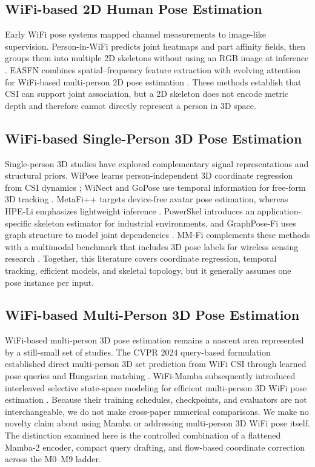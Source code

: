 \documentclass[conference,onecolumn]{IEEEtran}
\begin{document}
\subsection{WiFi-based 2D Human Pose Estimation}
Early WiFi pose systems mapped channel measurements to image-like supervision. Person-in-WiFi predicts joint heatmaps and part affinity fields, then groups them into multiple 2D skeletons without using an RGB image at inference \cite{wang2019personwifi2d}. EASFN combines spatial--frequency feature extraction with evolving attention for WiFi-based multi-person 2D pose estimation \cite{chen2023easfn}. These methods establish that CSI can support joint association, but a 2D skeleton does not encode metric depth and therefore cannot directly represent a person in 3D space.

\subsection{WiFi-based Single-Person 3D Pose Estimation}
Single-person 3D studies have explored complementary signal representations and structural priors. WiPose learns person-independent 3D coordinate regression from CSI dynamics \cite{jiang2020wipose}; WiNect and GoPose use temporal information for free-form 3D tracking \cite{ren2021winect,ren2022gopose}. MetaFi++ targets device-free avatar pose estimation, whereas HPE-Li emphasizes lightweight inference \cite{zhou2023metafiplus,gian2024hpeli}. PowerSkel introduces an application-specific skeleton estimator for industrial environments, and GraphPose-Fi uses graph structure to model joint dependencies \cite{yin2024powerskel,chen2025graphwifi}. MM-Fi complements these methods with a multimodal benchmark that includes 3D pose labels for wireless sensing research \cite{yang2023mmfi}. Together, this literature covers coordinate regression, temporal tracking, efficient models, and skeletal topology, but it generally assumes one pose instance per input.

\subsection{WiFi-based Multi-Person 3D Pose Estimation}
WiFi-based multi-person 3D pose estimation remains a nascent area represented by a still-small set of studies. The CVPR 2024 query-based formulation established direct multi-person 3D set prediction from WiFi CSI through learned pose queries and Hungarian matching \cite{yan2024personwifi3d}. WiFi-Mamba subsequently introduced interleaved selective state-space modeling for efficient multi-person 3D WiFi pose estimation \cite{nguyen2026wifimamba}. Because their training schedules, checkpoints, and evaluators are not interchangeable, we do not make cross-paper numerical comparisons. We make no novelty claim about using Mamba or addressing multi-person 3D WiFi pose itself. The distinction examined here is the controlled combination of a flattened Mamba-2 encoder, compact query drafting, and flow-based coordinate correction across the M0--M9 ladder.
\end{document}
